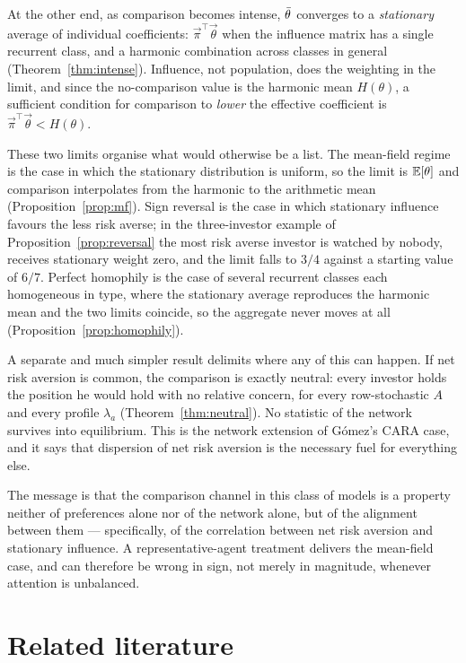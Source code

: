 At the other end, as comparison becomes intense, $\bar\theta$ converges to a
\emph{stationary} average of individual coefficients: $\vec\pi^{\top}\vec\theta$
when the influence matrix has a single recurrent class, and a harmonic
combination across classes in general (Theorem~\ref{thm:intense}). Influence,
not population, does the weighting in the limit, and since the no-comparison
value is the harmonic mean $H(\theta)$, a sufficient condition for comparison to
\emph{lower} the effective coefficient is $\vec\pi^{\top}\vec\theta<H(\theta)$.

These two limits organise what would otherwise be a list. The mean-field
regime is the case in which the stationary distribution is uniform, so the
limit is $\mathbb{E}[\theta]$ and comparison interpolates from the harmonic to the
arithmetic mean (Proposition~\ref{prop:mf}). Sign reversal is the case in which
stationary influence favours the less risk averse; in the three-investor example
of Proposition~\ref{prop:reversal} the most risk averse investor is watched by
nobody, receives stationary weight zero, and the limit falls to $3/4$ against a
starting value of $6/7$. Perfect homophily is the case of several recurrent
classes each homogeneous in type, where the stationary average reproduces the
harmonic mean and the two limits coincide, so the aggregate never moves at all
(Proposition~\ref{prop:homophily}).

A separate and much simpler result delimits where any of this can happen. If net
risk aversion is common, the comparison is exactly neutral: every investor holds
the position he would hold with no relative concern, for every row-stochastic
$A$ and every profile $\lambda_a$ (Theorem~\ref{thm:neutral}). No statistic of
the network survives into equilibrium. This is the network extension of Gómez's
CARA case, and it says that dispersion of net risk aversion is the necessary
fuel for everything else.

The message is that the comparison channel in this class of models is a property
neither of preferences alone nor of the network alone, but of the alignment
between them --- specifically, of the correlation between net risk aversion and
stationary influence. A representative-agent treatment delivers the mean-field
case, and can therefore be wrong in sign, not merely in magnitude, whenever
attention is unbalanced.

\section{Related literature}

